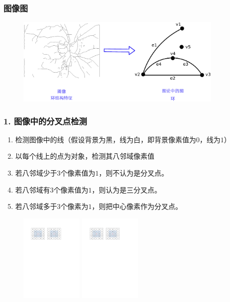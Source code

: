\documentclass[notheorems,mathserif,table,compress]{beamer}  %
\begin{document}
\begin{frame}
\frametitle{图像{\color{white}{$\Rightarrow$}}图}

\begin{figure}
\centering
    \includegraphics[width=10cm]{chap02/image-graph}\medskip
\end{figure}
\end{frame}



\begin{frame}
\frametitle{1. 图像中的分叉点检测}
\begin{enumerate}
\item 检测图像中的线（假设背景为黑，线为白，即背景像素值为$0$，线为$1$）
\item 以每个线上的点为对象，检测其八邻域像素值
\item 若八邻域少于$3$个像素值为$1$，则不认为是分叉点。
\item 若八邻域有$3$个像素值为$1$，则认为是三分叉点。
\item 若八邻域多于$3$个像素为$1$，则把中心像素作为分叉点。
\end{enumerate}
\begin{figure}
\centering
  \begin{minipage}[b]{0.33\textwidth} 
      \centering 
      \includegraphics[width=3cm]{chap02/3FeaturePoint}
    \end{minipage}
  \begin{minipage}[b]{0.33\textwidth}
    \centering
    \includegraphics[width=3cm]{chap02/4FeaturePoint}
  \end{minipage}
\caption*{\color{blue}{三分叉点与四分叉点}}
\end{figure}
\end{frame}
\end{document}
